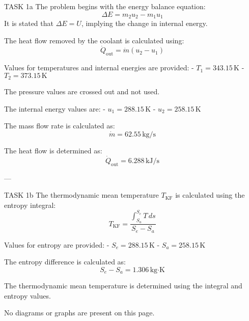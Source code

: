 TASK 1a  
The problem begins with the energy balance equation:  
\[
\Delta E = m_2 u_2 - m_1 u_1
\]  
It is stated that \(\Delta E = U\), implying the change in internal energy.  

The heat flow removed by the coolant is calculated using:  
\[
\dot{Q}_{\text{out}} = \dot{m} (u_2 - u_1)
\]  

Values for temperatures and internal energies are provided:  
- \(T_1 = 343.15 \, \text{K}\)  
- \(T_2 = 373.15 \, \text{K}\)  

The pressure values are crossed out and not used.  

The internal energy values are:  
- \(u_1 = 288.15 \, \text{K}\)  
- \(u_2 = 258.15 \, \text{K}\)  

The mass flow rate is calculated as:  
\[
\dot{m} = 62.55 \, \text{kg/s}
\]  

The heat flow is determined as:  
\[
\dot{Q}_{\text{out}} = 6.288 \, \text{kJ/s}
\]  

---

TASK 1b  
The thermodynamic mean temperature \(T_{\text{KF}}\) is calculated using the entropy integral:  
\[
T_{\text{KF}} = \frac{\int_{S_a}^{S_e} T \, ds}{S_e - S_a}
\]  

Values for entropy are provided:  
- \(S_e = 288.15 \, \text{K}\)  
- \(S_a = 258.15 \, \text{K}\)  

The entropy difference is calculated as:  
\[
S_e - S_a = 1.306 \, \text{kg·K}
\]  

The thermodynamic mean temperature is determined using the integral and entropy values.  

No diagrams or graphs are present on this page.